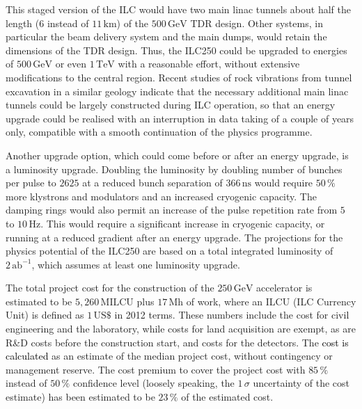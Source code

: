\documentclass[%
 reprint,
 amsmath,amssymb,
 aps,
]{revtex4-1}
\newcommand{\juan}[1]{\textcolor{black}{{#1}}}
\begin{document}
This staged version of the ILC  
would have two main linac tunnels about half the length ($6$ instead of $11\, {\mathrm{km}}$) of the $500\,{\mathrm{GeV}}$ TDR design. 
Other systems, in particular the beam delivery system and the main dumps, would retain the dimensions of the TDR design.
Thus, the ILC250 could be upgraded to energies of $500\,{\mathrm{GeV}}$ or even $1\,{\mathrm{TeV}}$ with a reasonable effort, without extensive modifications to the central region. 
Recent studies of rock vibrations from tunnel excavation in a similar geology indicate that the necessary additional main linac tunnels could be largely constructed during ILC operation, so that an energy upgrade could be realised with an interruption in data taking of a couple of years only, compatible with a smooth continuation of the physics programme.

Another upgrade option, which could come before or after an energy upgrade, is a luminosity upgrade. 
Doubling the luminosity by doubling number of bunches per pulse to $2625$ at a reduced bunch separation of $366\,{\mathrm{ns}}$ would require $50\,\%$ more klystrons and modulators and an increased cryogenic capacity. 
The damping rings would also permit an increase of the pulse repetition rate from $5$ to $10\,{\mathrm{Hz}}$. 
This would require a significant increase in cryogenic capacity, or running at a reduced gradient after an energy upgrade.
The projections for the physics potential of the ILC250 are based on a total integrated luminosity of $2\,{\mathrm{ab}}^{-1}$, which assumes at least one luminosity upgrade.

The total project cost for the construction of the $250\,{\mathrm{GeV}}$ accelerator is estimated to be $5,260\,{\mathrm{MILCU}}$ plus $17\,{\mathrm{Mh}}$ of work, where an ILCU (ILC Currency Unit) is defined as $1\,{\mathrm{US\$}}$ in 2012 terms. 
These numbers include the cost for civil engineering and the laboratory, while costs for land acquisition are exempt, as are R\&D costs before the construction start, and costs for the detectors.
The \juan{cost is calculated} as an estimate of the median project cost, without contingency or management reserve.
The cost premium to cover the project cost with $85\,\%$ instead of $50\,\%$ confidence level (loosely speaking, the $1\,\sigma$ uncertainty of the cost estimate) has been estimated to be $23\,\%$ of the estimated cost.
\end{document}
